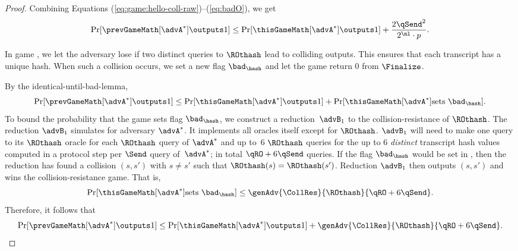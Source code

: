 \begin{proof}
	\noindent
	Combining Equations (\ref{eq:game:hello-coll-raw})--(\ref{eq:badO}), we get
	\begin{equation}\label{eq:game:hello-coll}
		\Pr[ \prevGameMath[\advA^*] \outputs 1 ] \leq \Pr[ \thisGameMath[\advA^*] \outputs 1 ] + \frac{2\qSend^2}{2^{\nl} \cdot p} .
	\end{equation}
	
	
	In game \thisGameMath[\advA^*], we let the adversary lose if two distinct queries to $\ROthash$ lead to colliding outputs.
	This ensures that each transcript has a unique hash.
	When such a collision occurs, we set a new flag $\bad_\hash$ and let the game return $0$ from $\Finalize$.
	
	
	By the identical-until-bad-lemma,
	\[
		\Pr[ \prevGameMath[\advA^*] \outputs 1 ] \leq \Pr[ \thisGameMath[\advA^*] \outputs 1 ] + \Pr[\thisGameMath[\advA^*] \text{sets }\bad_\hash] .	
	\]
	To bound the probability that the game sets flag $\bad_\hash$, we construct a reduction~$\advB_1$ to the collision-resistance of $\ROthash$.
	The reduction $\advB_1$ simulates \thisGame for adversary $\advA^*$.
	It implements all oracles itself except for $\ROthash$.
	$\advB_1$ will need to make one query to its $\ROthash$ oracle for each $\ROthash$ query of $\advA^*$ and up to~$6$ $\ROthash$ queries for the up to 6 \emph{distinct} transcript hash values computed in a protocol step per $\Send$ query of~$\advA^*$; in total $\qRO+6\qSend$ queries.
	If the flag $\bad_\hash$ would be set in \thisGame, then the reduction has found a collision $(s,s')$ with $s \neq s'$ such that $\ROthash(s) = \ROthash(s')$.
	Reduction $\advB_1$ then outputs $(s,s')$ and wins the collision-resistance game.
	That is,
	\[
		\Pr[\thisGameMath[\advA^*] \text{sets }\bad_\hash] \leq \genAdv{\CollRes}{\ROthash}{\qRO+6\qSend}.
	\]
	Therefore, it follows that
	\[ 
		\Pr[ \prevGameMath[\advA^*] \outputs 1 ] \leq \Pr[ \thisGameMath[\advA^*] \outputs 1 ] + \genAdv{\CollRes}{\ROthash}{\qRO+6\qSend}.
	\]


\end{proof}
